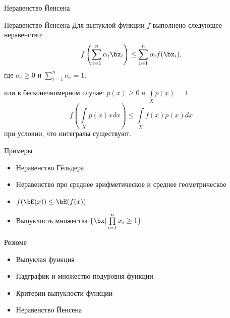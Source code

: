 \documentclass[12pt,russian]{beamer}
\begin{document}
\begin{frame}{Неравенство Йенсена}
 
\begin{block}{Неравенство Йенсена}
Для выпуклой функции $f$ выполнено следующее неравенство:
\vspace{-4mm}
\[
f\left( \sum\limits_{i=1}^n \alpha_i \bx_i \right) \leq \sum\limits_{i=1}^n \alpha_i f(\bx_i),
\vspace{-4mm}
\] 
где $\alpha_i \geq 0$ и $\sum\limits_{i=1}^n \alpha_i = 1$.
\end{block}

или в бесконечномерном случае: $p(x) \geq 0$ и $\int\limits_X p(x) = 1$ 
\vspace{-4mm}
\[
f\left( \int\limits_X p(x)xdx \right) \leq \int\limits_X f(x)p(x)dx
\]
при условии, что интегралы существуют.

\end{frame}

\begin{frame}{Примеры}
\begin{itemize}
\item Неравенство Гёльдера
\item Неравенство про среднее арифметическое и среднее геометрическое
\item $f(\bE(x)) \leq \bE(f(x))$
\item Выпуклость множества $\{ \bx | \prod\limits_{i=1}^n x_i \geq 1 \}$
\end{itemize}
\end{frame}

\begin{frame}{Резюме}
\begin{itemize}
\item Выпуклая функция
\item Надграфик и множество подуровня функции
\item Критерии выпуклости функции
\item Неравенство Йенсена
\end{itemize}
\end{frame}
\end{document}

